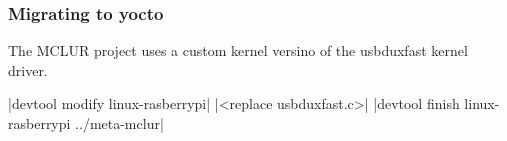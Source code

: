 \documentclass[../../main.tex]{subfiles}
\begin{document}
\subsubsection{Migrating to yocto}%
\label{ssub:migrating_to_yocto}

The MCLUR project uses a custom kernel versino of the usbduxfast kernel driver.

|devtool modify linux-rasberrypi|
|<replace usbduxfast.c>|
|devtool finish linux-rasberrypi ../meta-mclur|

	
\end{document}
